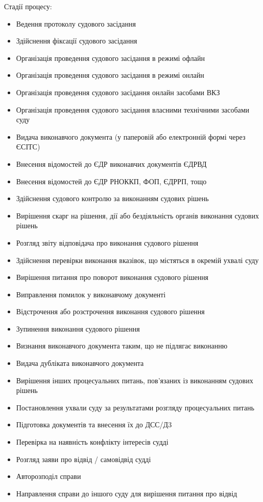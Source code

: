 \documentclass{article}
\begin{document}
Стадії процесу:

\begin{itemize}
    \item Ведення протоколу судового засідання
    \item Здійснення фіксації судового засідання
    \item Організація проведення судового засідання в режимі офлайн
    \item Організація проведення судового засідання в режимі онлайн
    \item Організація проведення судового засідання онлайн засобами ВКЗ
    \item Організація проведення судового засідання власними технічними засобами суду
    \item Видача виконавчого документа (у паперовій або електронній формі через ЄСІТС)
    \item Внесення відомостей до ЄДР виконавчих документів ЄДРВД
    \item Внесення відомостей до ЄДР РНОККП, ФОП, ЄДРРП, тощо
    \item Здійснення судового контролю за виконанням судових рішень
    \item Вирішення скарг на рішення, дії або бездіяльність органів виконання судових рішень
    \item Розгляд звіту відповідача про виконання судового рішення
    \item Здійснення перевірки виконання вказівок, що містяться в окремій ухвалі суду
    \item Вирішення питання про поворот виконання судового рішення
    \item Виправлення помилок у виконавчому документі
    \item Відстрочення або розстрочення виконання судового рішення
    \item Зупинення виконання судового рішення
    \item Визнання виконавчого документа таким, що не підлягає виконанню
    \item Видача дубліката виконавчого документа
    \item Вирішення інших процесуальних питань, пов’язаних із виконанням судових рішень
    \item Постановлення ухвали суду за результатами розгляду процесуальних питань
    \item Підготовка документів та внесення їх до ДСС/Д3
    \item Перевірка на наявність конфлікту інтересів судді
    \item Розгляд заяви про відвід / самовідвід судді
    \item Авторозподіл справи
    \item Направлення справи до іншого суду для вирішення питання про відвід
\end{itemize}
\end{document}
